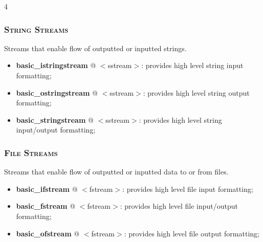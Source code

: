 \documentclass[10pt]{article}
\begin{document}
\begin{multicols*}{4}
{\subsubsection*{\textsc{String Streams}}
\noindent
Streams that enable flow of outputted or inputted strings.

\begin{itemize}[leftmargin=*,topsep=0.25pt]
  \setlength\itemsep{-1.8pt}
	\item \textbf{basic\_istringstream} @ $<$sstream$>$: provides high level string input formatting;
	\item \textbf{basic\_ostringstream} @ $<$sstream$>$: provides high level string output formatting;
	\item \textbf{basic\_stringstream} @ $<$sstream$>$: provides high level string input/output formatting;
\end{itemize}


\subsubsection*{\textsc{File Streams}} 
\noindent
Streams that enable flow of outputted or inputted data to or from files.

\begin{itemize}[leftmargin=*,topsep=0.25pt]
  \setlength\itemsep{-1.8pt}
	\item \textbf{basic\_ifstream} @ $<$fstream$>$: provides high level file input formatting;
	\item \textbf{basic\_fstream} @ $<$fstream$>$: provides high level file input/output formatting;
	\item \textbf{basic\_ofstream} @ $<$fstream$>$: provides high level file output formatting;
\end{itemize}

}
\end{multicols*}
\end{document}
